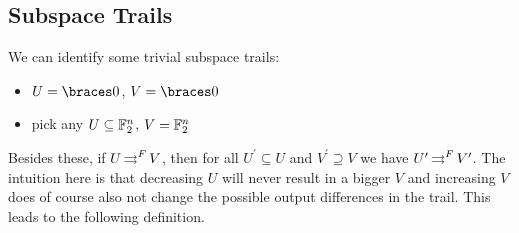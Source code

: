 \subsection{Subspace Trails}

We can identify some trivial subspace trails:
\begin{itemize}
    \item $U = \set{0}$, $V = \set{0}$
    \item pick any $U \subseteq \mathbb{F}_2^n$, $V = \mathbb{F}_2^n$
\end{itemize}
Besides these, if $U \operatorname*{\rightrightarrows}^{F}_{} V$, then for all $U^\prime \subseteq U$ and $V^\prime \supseteq V$ we have $U^\prime \operatorname*{\rightrightarrows}^{F}_{} V^\prime$.
The intuition here is that decreasing $U$ will never result in a bigger $V$ and increasing $V$ does of course also not change the possible output differences in the trail.
This leads to the following definition.

